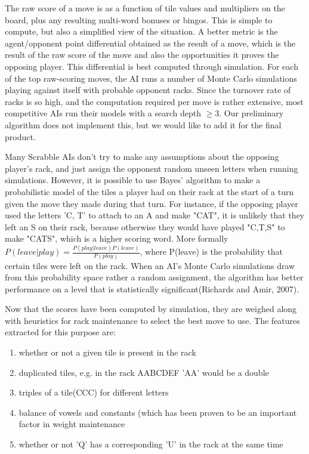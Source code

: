 \documentclass[12pt]{article}
\begin{document}
The raw score of a move is as a function of tile values and
multipliers on the board, plus any resulting multi-word bonuses or
bingos. This is simple to compute, but also a simplified view of the
situation. A better metric is the agent/opponent point differential
obtained as the result of a move, which is the result of the raw score
of the move and also the opportunities it proves the opposing
player. This differential is best computed through simulation. For
each of the top raw-scoring moves, the AI runs a number of Monte Carlo
simulations playing against itself with probable opponent racks. Since
the turnover rate of racks is so high, and the computation required
per move is rather extensive, most competitive AIs run their models
with a search depth $\geq 3$. Our preliminary algorithm does not
implement this, but we would like to add it for the final product.

Many Scrabble AIs don't try to make any assumptions about the opposing
player's rack, and just assign the opponent random unseen letters when
running simulations. However, it is possible to use Bayes' algorithm
to make a probabilistic model of the tiles a player had on their rack
at the start of a turn given the move they made during that turn.%
For instance, if the opposing player used the letters 'C, T' to attach
to an A and make "CAT", it is unlikely that they left an S on their
rack, because otherwise they would have played "C,T,S" to make "CATS",
which is a higher scoring word. More formally $P(leave | play) =
\frac{P(play | leave)P(leave)}{P(play)}$, where P(leave) is the
probability that certain tiles were left on the rack. When an AI's
Monte Carlo simulations draw from this probability space rather a
random assignment, the algorithm has better performance on a level
that is statistically significant(Richards and Amir, 2007).

	
Now that the scores have been computed by simulation, they are weighed
along with heuristics for rack maintenance to select the best move to
use. The features extracted for this purpose are:

\begin{enumerate}
  \item whether or not a given tile is present in the rack
  \item duplicated tiles, e.g. in the rack AABCDEF 'AA' would be a double
  \item triples of a tile(CCC) for different letters
  \item balance of vowels and constants (which has been proven to be
    an important factor in weight maintenance
  \item whether or not 'Q' has a corresponding 'U' in the rack at the same time
\end{enumerate}
\end{document}
